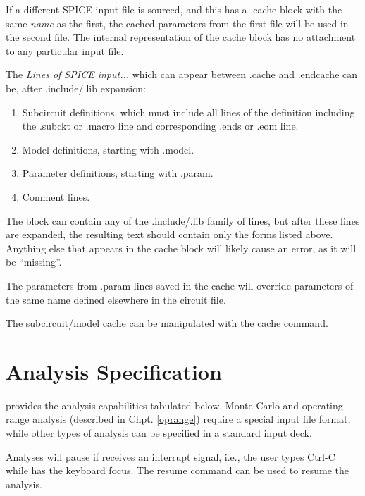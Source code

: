 If a different SPICE input file is sourced, and this has a {\vt
.cache} block with the same {\it name} as the first, the cached
parameters from the first file will be used in the second file.  The
internal representation of the cache block has no attachment to any
particular input file.

The {\it Lines of SPICE input...} which can appear between {\vt
.cache} and {\vt .endcache} can be, after {\vt .include}/{\vt .lib}
expansion:

\begin{enumerate}
\item{Subcircuit definitions, which must include all lines of the
    definition including the {\vt .subckt} or {\vt .macro} line and
    corresponding {\vt .ends} or {\vt .eom} line.}
\item{Model definitions, starting with {\vt .model}.}
\item{Parameter definitions, starting with {\vt .param}.}
\item{Comment lines.}
\end{enumerate}

The block can contain any of the {\vt .include}/{\vt .lib} family of
lines, but after these lines are expanded, the resulting text should
contain only the forms listed above.  Anything else that appears in
the cache block will likely cause an error, as it will be ``missing''.

The parameters from {\vt .param} lines saved in the cache will
override parameters of the same name defined elsewhere in the circuit
file.

The subcircuit/model cache can be manipulated with the {\WRspice}
{\cb cache} command.


\section{Analysis Specification}


{\WRspice} provides the analysis capabilities tabulated below. 
Monte Carlo and operating range analysis (described in Chpt. 
\ref{oprange}) require a special input file format, while other types
of analysis can be specified in a standard input deck.

Analyses will pause if {\WRspice} receives an interrupt signal, i.e.,
the user types {\kb Ctrl-C} while {\WRspice} has the keyboard focus. 
The {\cb resume} command can be used to resume the analysis.

